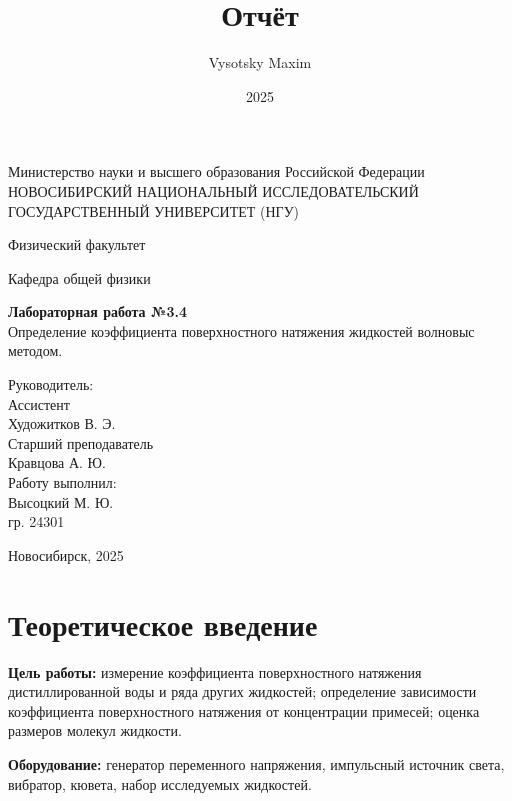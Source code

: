 \documentclass[a4paper,14pt]{article}
\author{Vysotsky Maxim}
\title{Отчёт}
\date{2025}
\begin{document}
	\begin{titlepage}
		\begin{center}
			{Министерство науки и высшего образования Российской Федерации
				НОВОСИБИРСКИЙ НАЦИОНАЛЬНЫЙ ИССЛЕДОВАТЕЛЬСКИЙ
				ГОСУДАРСТВЕННЫЙ УНИВЕРСИТЕТ (НГУ)}
		\end{center}
		\begin{center}
			{Физический факультет}
		\end{center}
		\begin{center}
			{Кафедра общей физики}
		\end{center}
		
		
		\vspace{7cm}
		{
			\begin{center}
				{\bf Лабораторная работа №3.4}\\
			Определение коэффициента поверхностного
натяжения жидкостей волновыс методом.
			\end{center}
		}
		\vspace{2cm}
		\begin{flushright}
			{Руководитель:\\ Ассистент\\
				Художитков В. Э.\\
                Старший преподаватель \\
                Кравцова А. Ю.\\
				Работу выполнил:\\
				Высоцкий М. Ю.\\
				\vspace{0.2cm}
				гр. 24301}
		\end{flushright}
		\vspace{3cm}
		\begin{center}
			Новосибирск, 2025
		\end{center}
	\end{titlepage}


\section{Теоретическое введение}
\hspace{\parindent}\textbf{Цель работы:} измерение коэффициента поверхностного
натяжения дистиллированной воды и ряда других жидкостей;
определение зависимости коэффициента поверхностного
натяжения от концентрации примесей; оценка размеров молекул
жидкости.

\textbf{Оборудование:} генератор переменного напряжения,
импульсный источник света, вибратор, кювета, набор
исследуемых жидкостей.
\end{document}
